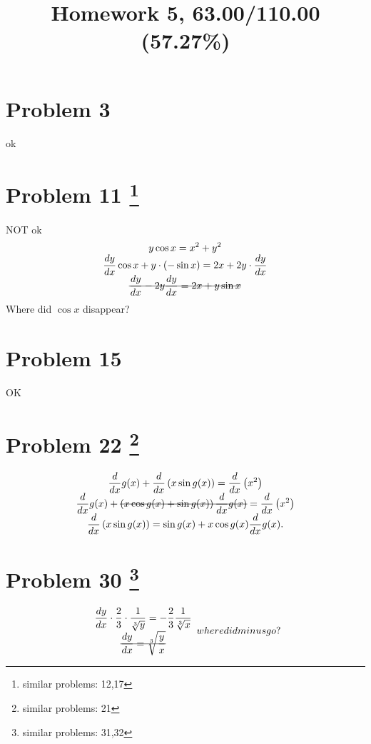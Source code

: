 \documentclass[10pt]{article} %
\title{Homework 5,
63.00/110.00 (57.27\%)
}
\begin{document}
\maketitle

\section*{Problem 3 }
ok
\section*{Problem 11 \footnote{similar problems: 12,17}}
NOT ok
\begin{equation*}
	\begin{array}[]{c}
	\displaystyle y \cos x=x^2+y^2\\
	\displaystyle\frac{{dy}}{{dx}}\cos x+y\cdot(-\sin x)=2x+2y\cdot\frac{dy}{dx}\\
	\mbox{\sout{$\displaystyle\frac{dy}{dx}-2y\frac{dy}{dx}
		=2x+y\sin x$}}
	\end{array}
\end{equation*}
Where did $\cos x$ disappear?
\section*{Problem 15 }
OK
\section*{Problem 22 \footnote{similar problems: 21}}
\begin{equation*}
	\begin{array}[]{c}
		\displaystyle\frac{d}{dx}g(x)+\frac{d}{dx}\left( x\sin g(x) \right)=\frac{d}{dx}\left( x^2 \right)\\
		\displaystyle\frac{d}{dx}g(x)+\mbox{\sout{$
			\displaystyle\left( x\cos g(x)+\sin g(x) \right)\frac{d}{dx}g(x)
		$}}
		=\frac{d}{dx}\left( x^2 \right)
		\\
		\displaystyle\frac{d}{dx}\left( x\sin g(x) \right)=\sin g(x)+x\cos g(x)\frac{d}{dx}g(x).
	\end{array}
\end{equation*}
\section*{Problem 30 \footnote{similar problems: 31,32}}
\begin{equation*}
	\begin{array}[]{c}
		\displaystyle\frac{dy}{dx}\cdot\frac{2}{3}\cdot\frac{1}{\sqrt[3]{y}}=-\frac{2}{3}
		\frac{1}{\sqrt[3]{x}}\\
		\mbox{\sout{$\displaystyle
		\frac{dy}{dx}=\sqrt[3]{\frac{y}{x}}
		$}}
	\end{array}
	where did minus go?
\end{equation*}
\end{document}
